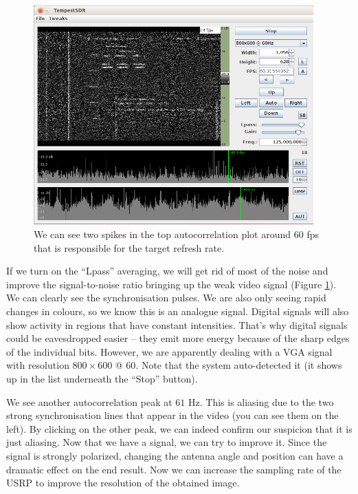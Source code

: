 \documentclass[a4paper,12pt,twoside,openright]{report}
\begin{document}
\begin{figure}[h]
\centering
  \includegraphics[width=0.96\textwidth]{demo_receivingimage}
  \caption{We can see two spikes in the top autocorrelation plot around $60$ fps that is responsible for the target refresh rate.}
  \label{fig:demoreception}
\end{figure}

If we turn on the ``Lpass'' averaging, we will get rid of most of the noise and improve the signal-to-noise ratio bringing up the weak video signal (Figure \ref{fig:demoreception}). We can clearly see the synchronisation pulses. We are also only seeing rapid changes in colours, so we know this is an analogue signal. Digital signals will also show activity in regions that have constant intensities. That's why digital signals could be eavesdropped easier -- they emit more energy because of the sharp edges of the individual bits. However, we are apparently dealing with a VGA signal with resolution $800 \times 600$ @ $60$. Note that the system auto-detected it (it shows up in the list underneath the ``Stop'' button).

We see another autocorrelation peak at $61$ Hz. This is aliasing due to the two strong synchronisation lines that appear in the video (you can see them on the left). By clicking on the other peak, we can indeed confirm our suspicion that it is just aliasing. Now that we have a signal, we can try to improve it. Since the signal is strongly polarized, changing the antenna angle and position can have a dramatic effect on the end result. Now we can increase the sampling rate of the USRP to improve the resolution of the obtained image.
\end{document}
